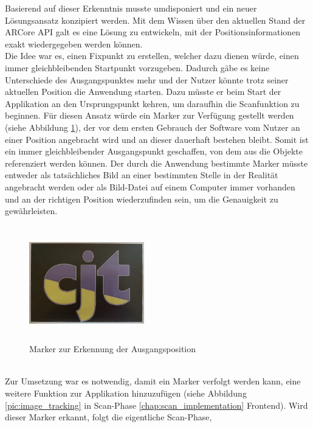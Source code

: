 Basierend auf dieser Erkenntnis musste umdisponiert und ein neuer Lösungsansatz konzipiert werden. Mit dem Wissen über den aktuellen Stand der ARCore \acs{API} 
galt es eine Lösung zu entwickeln, mit der Positionsinformationen exakt wiedergegeben werden können. 
\\ 
\linebreak
Die Idee war es, einen Fixpunkt zu erstellen, welcher dazu dienen würde, einen immer gleichbleibenden Startpunkt vorzugeben. Dadurch gäbe es keine Unterschiede des 
Ausgangspunktes mehr und der Nutzer könnte trotz seiner aktuellen Position die Anwendung starten. Dazu müsste er beim Start der Applikation an den Ursprungspunkt kehren, 
um daraufhin die Scanfunktion zu beginnen. Für diesen Ansatz würde ein Marker zur Verfügung gestellt werden (siehe Abbildung \ref{pic:initialMarker}), der vor dem ersten 
Gebrauch der Software vom Nutzer an einer Position angebracht wird und an dieser dauerhaft bestehen bleibt. Somit ist ein immer gleichbleibender Ausgangspunkt geschaffen, 
von dem aus die Objekte referenziert werden können. Der durch die Anwendung bestimmte Marker müsste entweder als tatsächliches Bild an einer bestimmten Stelle in der 
Realität angebracht werden oder als Bild-Datei auf einem Computer immer vorhanden und an der richtigen Position wiederzufinden sein, um die Genauigkeit zu 
gewährleisten. 
\begin{figure}[hbt!]
    \centering
    \includegraphics[width=5cm,height=5cm,keepaspectratio]{4Umsetzung/Bilder/cjt_logo_tracking.png}
    \caption{Marker zur Erkennung der Ausgangsposition}
    \label{pic:initialMarker}
\end{figure}
\\
Zur Umsetzung war es notwendig, damit ein Marker verfolgt werden kann, eine weitere Funktion zur Applikation hinzuzufügen (siehe Abbildung \ref{pic:image_tracking} 
in Scan-Phase \ref{chap:scan_implementation} Frontend). Wird dieser Marker erkannt, folgt die eigentliche Scan-Phase, 
